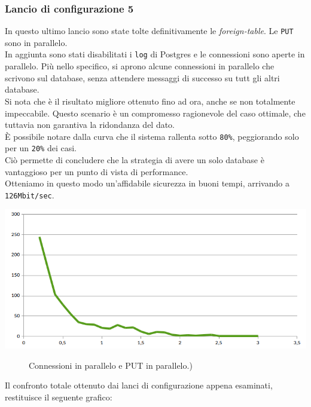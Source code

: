 \subsubsection{Lancio di configurazione 5}
In questo ultimo lancio sono state tolte definitivamente le \textit{foreign-table}. Le \verb"PUT" sono in parallelo. \\
In aggiunta sono stati disabilitati i \verb"log" di Postgres e le connessioni sono aperte in parallelo. Pi\`{u} nello specifico, si aprono alcune connessioni in parallelo che scrivono sul database, senza attendere messaggi di successo su tutt gli altri database. \\
Si nota che \`{e} il risultato migliore ottenuto fino ad ora, anche se non totalmente impeccabile. Questo scenario \`{e} un compromesso ragionevole del caso ottimale, che tuttavia non garantiva la ridondanza del dato.\\
\`{E} possibile notare dalla curva che il sistema rallenta sotto \verb"80%", peggiorando solo per un \verb"20%" dei casi. \\
Ci\`{o} permette di concludere che la strategia di avere un solo database \`{e} vantaggioso per un punto di vista di performance. \\
Otteniamo in questo modo un'affidabile sicurezza in buoni tempi, arrivando a \verb"126Mbit/sec". 

\begin{center}
\includegraphics[scale=0.70]{img/round8c.png}
\end{center}
\begin{figure}[htbp]
\caption{Connessioni in parallelo e PUT in parallelo.) \label{figura1.15}}
\end{figure}

Il confronto totale ottenuto dai lanci di configurazione appena esaminati, restituisce il seguente grafico:

